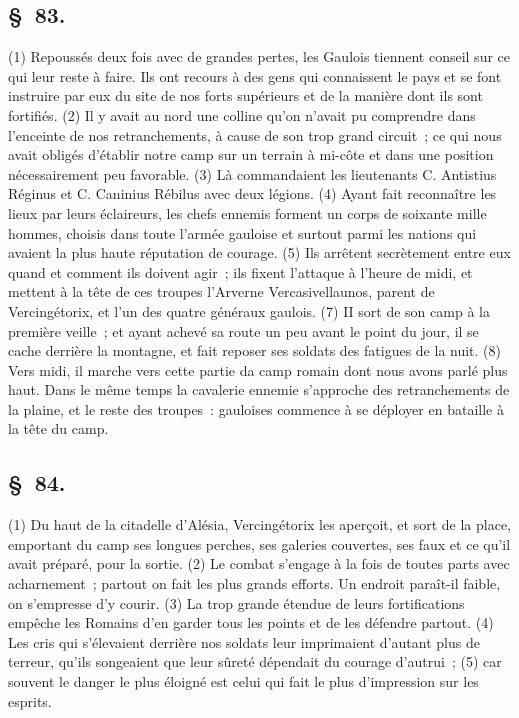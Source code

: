 \documentclass[french,twoside]{book} %
\begin{document}
\subsection[{§ 83.}]{ \textsc{§ 83.} }
\noindent (1) Repoussés deux fois avec de grandes pertes, les Gaulois tiennent conseil sur ce qui leur reste à faire. Ils ont recours à des gens qui connaissent le pays et se font instruire par eux du site de nos forts supérieurs et de la manière dont ils sont fortifiés. (2) Il y avait au nord une colline qu’on n’avait pu comprendre dans l’enceinte de nos retranchements, à cause de son trop grand circuit ; ce qui nous avait obligés d’établir notre camp sur un terrain à mi-côte et dans une position nécessairement peu favorable. (3) Là commandaient les lieutenants C. Antistius Réginus et C. Caninius Rébilus avec deux légions. (4) Ayant fait reconnaître les lieux par leurs éclaireurs, les chefs ennemis forment un corps de soixante mille hommes, choisis dans toute l’armée gauloise et surtout parmi les nations qui avaient la plus haute réputation de courage. (5) Ils arrêtent secrètement entre eux quand et comment ils doivent agir ; ils fixent l’attaque à l’heure de midi, et mettent à la tête de ces troupes l’Arverne Vercasivellaunos, parent de Vercingétorix, et l’un des quatre généraux gaulois. (7) II sort de son camp à la première veille ; et ayant achevé sa route un peu avant le point du jour, il se cache derrière la montagne, et fait reposer ses soldats des fatigues de la nuit. (8) Vers midi, il marche vers cette partie da camp romain dont nous avons parlé plus haut. Dans le même temps la cavalerie ennemie s’approche des retranchements de la plaine, et le reste des troupes : gauloises commence à se déployer en bataille à la tête du camp.
\subsection[{§ 84.}]{ \textsc{§ 84.} }
\noindent (1) Du haut de la citadelle d’Alésia, Vercingétorix les aperçoit, et sort de la place, emportant du camp ses longues perches, ses galeries couvertes, ses faux et ce qu’il avait préparé, pour la sortie. (2) Le combat s’engage à la fois de toutes parts avec acharnement ; partout on fait les plus grands efforts. Un endroit paraît-il faible, on s’empresse d’y courir. (3) La trop grande étendue de leurs fortifications empêche les Romains d’en garder tous les points et de les défendre partout. (4) Les cris qui s’élevaient derrière nos soldats leur imprimaient d’autant plus de terreur, qu’ils songeaient que leur sûreté dépendait du courage d’autrui ; (5) car souvent le danger le plus éloigné est celui qui fait le plus d’impression sur les esprits.
\end{document}
